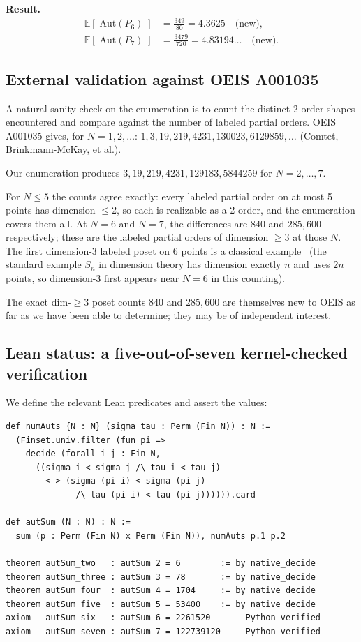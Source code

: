 \documentclass[11pt]{article}
\theoremstyle{definition}
\begin{document}
\textbf{Result.}
\begin{align*}
    \mathbb{E}[|\mathrm{Aut}(P_6)|] &= \frac{349}{80} = 4.3625 \quad \text{(new)}, \\
    \mathbb{E}[|\mathrm{Aut}(P_7)|] &= \frac{3479}{720} = 4.83194\ldots \quad \text{(new)}.
\end{align*}

\subsection{External validation against OEIS A001035}

A natural sanity check on the enumeration is to count the distinct 2-order shapes
encountered and compare against the number of labeled partial orders. OEIS
A001035 gives, for $N = 1, 2, \ldots$:
$1, 3, 19, 219, 4231, 130023, 6129859, \ldots$ (Comtet, Brinkmann-McKay, et al.).

Our enumeration produces $3, 19, 219, 4231, 129183, 5844259$ for $N = 2, \ldots, 7$.

For $N \le 5$ the counts agree exactly: every labeled partial order on at most 5
points has dimension $\le 2$, so each is realizable as a 2-order, and the
enumeration covers them all. At $N = 6$ and $N = 7$, the differences are $840$
and $285{,}600$ respectively; these are the labeled partial orders of dimension
$\ge 3$ at those $N$. The first dimension-3 labeled poset on 6 points is a
classical example~\cite{trotter} (the standard example $S_n$ in dimension theory
has dimension exactly $n$ and uses $2n$ points, so dimension-3 first appears
near $N = 6$ in this counting).

The exact dim-$\ge 3$ poset counts $840$ and $285{,}600$ are themselves new to
OEIS as far as we have been able to determine; they may be of independent
interest.

\subsection{Lean status: a five-out-of-seven kernel-checked verification}

We define the relevant Lean predicates and assert the values:

\begin{lstlisting}
def numAuts {N : N} (sigma tau : Perm (Fin N)) : N :=
  (Finset.univ.filter (fun pi =>
    decide (forall i j : Fin N,
      ((sigma i < sigma j /\ tau i < tau j)
        <-> (sigma (pi i) < sigma (pi j)
              /\ tau (pi i) < tau (pi j)))))).card

def autSum (N : N) : N :=
  sum (p : Perm (Fin N) x Perm (Fin N)), numAuts p.1 p.2

theorem autSum_two   : autSum 2 = 6        := by native_decide
theorem autSum_three : autSum 3 = 78       := by native_decide
theorem autSum_four  : autSum 4 = 1704     := by native_decide
theorem autSum_five  : autSum 5 = 53400    := by native_decide
axiom   autSum_six   : autSum 6 = 2261520    -- Python-verified
axiom   autSum_seven : autSum 7 = 122739120  -- Python-verified
\end{lstlisting}
\end{document}

